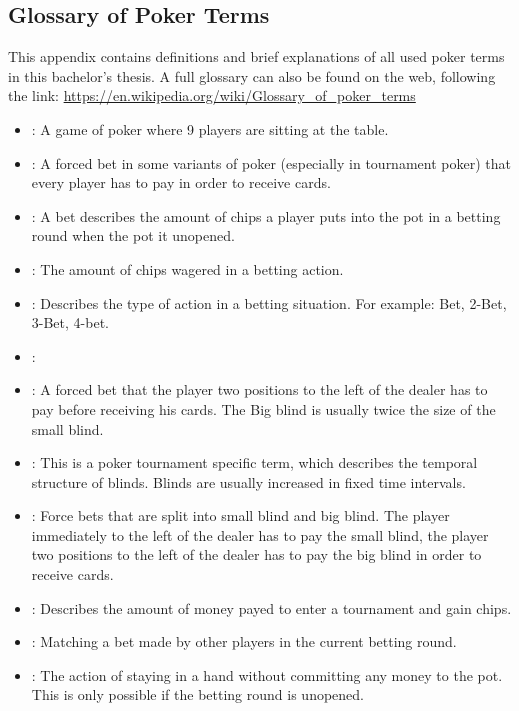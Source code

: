 \begin{appendices}
\chapter{Glossary of Poker Terms}
This appendix contains definitions and brief explanations of all used poker terms in this bachelor's thesis. A full glossary can also be found on the web, following the link: \href{https://en.wikipedia.org/wiki/Glossary_of_poker_terms}{https://en.wikipedia.org/wiki/Glossary\_of\_poker\_terms}
\begin{itemize}
\item {}:
A game of poker where 9 players are sitting at the table.
\item {}:
A forced bet in some variants of poker (especially in tournament poker) that every player has to pay in order to receive cards.
\item {}:
A bet describes the amount of chips a player puts into the pot in a betting round when the pot it unopened.
\item {}:
The amount of chips wagered in a betting action.
\item {}:
Describes the type of action in a betting situation. For example: Bet, 2-Bet, 3-Bet, 4-bet.
\item {}:
\item {}:
A forced bet that the player two positions to the left of the dealer has to pay before receiving his cards. The Big blind is usually twice the size of the small blind.
\item {}:
This is a poker tournament specific term, which describes the temporal structure of blinds. Blinds are usually increased in fixed time intervals.
\item {}:
Force bets that are split into small blind and big blind. The player immediately to the left of the dealer has to pay the small blind, the player two positions to the left of the dealer has to pay the big blind in order to receive cards.
\item {}:
Describes the amount of money payed to enter a tournament and gain chips.
\item {}:
Matching a bet made by other players in the current betting round.
\item {}:
The action of staying in a hand without committing any money to the pot. This is only possible if the betting round is unopened.

\end{itemize}
\end{appendices}
